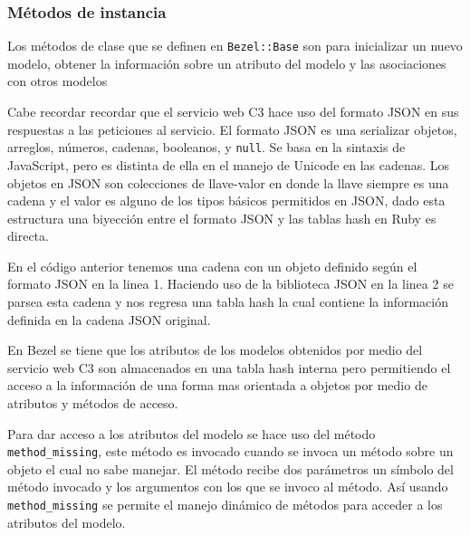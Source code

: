 \subsubsection{Métodos de instancia}

Los métodos de clase que se definen en \texttt{Bezel::Base} son para
inicializar un nuevo modelo, obtener la información sobre un atributo
del modelo y las asociaciones con otros modelos

Cabe recordar recordar que el servicio web C3 hace uso del formato JSON en sus
respuestas a las peticiones al servicio. El formato JSON es una serializar objetos,
arreglos, números, cadenas, booleanos, y \texttt{null}. Se basa en la sintaxis de
JavaScript, pero es distinta de ella en el manejo de Unicode en las cadenas.
Los objetos en JSON son colecciones de llave-valor en donde la llave siempre
es una cadena y el valor es alguno de los tipos básicos permitidos en JSON, dado
esta estructura una biyección entre el formato JSON y las tablas hash en Ruby
es directa.



En el código anterior tenemos una cadena con un objeto definido según el formato
JSON en la linea 1. Haciendo uso de la biblioteca JSON en la linea 2 se parsea
esta cadena y nos regresa una tabla hash la cual contiene la información definida
en la cadena JSON original.

En Bezel se tiene que los atributos de los modelos obtenidos por medio del servicio
web C3 son almacenados en una tabla hash interna pero permitiendo el acceso a la
información de una forma mas orientada a objetos por medio de atributos y métodos
de acceso.



Para dar acceso a los atributos del modelo se hace uso del método
\texttt{method\_missing}, este método es invocado cuando se invoca un
método sobre un objeto el cual no sabe manejar. El método recibe dos parámetros
un símbolo del método invocado y los argumentos con los que se invoco al método.
Así usando \texttt{method\_missing} se permite el manejo dinámico de métodos
para acceder a los atributos del modelo.

